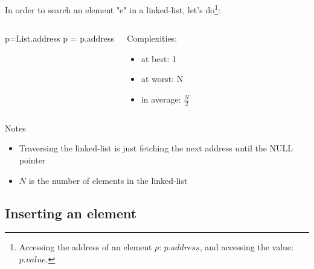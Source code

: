 \documentclass{beamer}[10pt, usepdftitle=false, handout]
\begin{document}
	\begin{frame}
	
	In order to search an element "e" in a linked-list, let's do\footnote{Accessing the address of an element $p$: $p.address$, and accessing the value: $p.value$.}:
	
	\vspace*{1em}	
	
	\begin{columns}[c]
	\begin{center}    
    \scalebox{0.75} {
    \begin{algorithm}[H]
    p=List.address\;
     {
		p = p.address\;
	}
	\end{algorithm}	
	}
	\end{center}	 
	\begin{center}
	Complexities: 
	\begin{itemize}
		\item {at best: 1}
		\item {at worst: N}
		\item {in average: $\frac{N}{2}$}
	\end{itemize}		
	\end{center}
	\end{columns}		
	
	\vspace*{1em}	
	
	\pause	
	
	\begin{block}{Notes}
	\begin{itemize}
		\item {Traversing the linked-list is just fetching the next address until the NULL pointer}
		\item {$N$ is the number of elements in the linked-list}
	\end{itemize}
	\end{block}	

	\end{frame}
	
	\subsection{Inserting an element}
	
\end{document}
